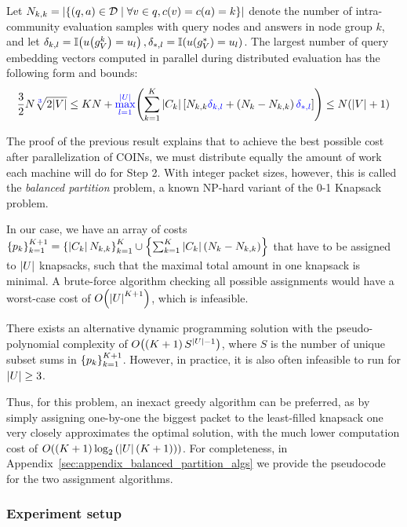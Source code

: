 \begin{proposition}
\label{proposition:complexity_distributed}
    Let $N_{k,k}=\mathopen{}\left|\mathopen{}\left\{\mathopen{}\left(q, a\right) \in \mathcal{D} \mid \forall v \in q, c\mathopen{}\left(v\right)=c\mathopen{}\left(a\right)=k\right\}\right|$ denote the number of intra-community evaluation samples with query nodes and answers in node group $k$, and let $\delta_{k,l}=\mathbb{I}\mathopen{}\left(u\mathopen{}\left(g_V^k\right)=u_l\right),\delta_{*,l}=\mathbb{I}\mathopen{}\left(u\mathopen{}\left(g_V^*\right)=u_l\right)$. The largest number of query embedding vectors computed in parallel during distributed evaluation has the following form and bounds:
\begin{equation}
\label{eq:complexity_and_bounds_distributed}
\frac{3}{2} N \sqrt[\textcolor{blue}{3}]{2\mathopen{}\left|V\right|} \leq KN+\textcolor{blue}{\max_{l=1}^{\mathopen{}\left|U\right|}}{\mathopen{}\left(\sum_{k=1}^{K}{\mathopen{}\left|C_k\right|\mathopen{}\left[N_{k,k}\textcolor{blue}{\delta_{k,l}} + \mathopen{}\left(N_k-N_{k,k}\right)\textcolor{blue}{\delta_{*,l}}\right]}\right)} \leq N \mathopen{}\left(\mathopen{}\left|V\right| + 1\right) 
\end{equation}
\end{proposition}
The proof of the previous result explains that to achieve the best possible cost after parallelization of COINs, we must distribute equally the amount of work each machine will do for Step 2. With integer packet sizes, however, this is called the \emph{balanced partition} problem, a known NP-hard variant of the 0-1 Knapsack problem. 

In our case, we have an array of costs $\mathopen{}\left\{p_k\right\}_{k=1}^{K+1}=\mathopen{}\left\{\mathopen{}\left|C_k\right|N_{k,k}\right\}_{k=1}^{K}\cup\mathopen{}\left\{\sum_{k=1}^{K}{\mathopen{}\left|C_k\right|\mathopen{}\left(N_{k}-N_{k,k}\right)}\right\}$ that have to be assigned to $\mathopen{}\left|U\right|$ knapsacks, such that the maximal total amount in one knapsack is minimal. A brute-force algorithm checking all possible assignments would have a worst-case cost of $O\mathopen{}\left(\mathopen{}\left|U\right|^{K+1}\right)$, which is infeasible. 

There exists an alternative dynamic programming solution with the pseudo-polynomial complexity of $O\mathopen{}\left(\mathopen{}\left(K+1\right)S^{\mathopen{}\left|U\right|-1}\right)$, where $S$ is the number of unique subset sums in $\mathopen{}\left\{p_k\right\}_{k=1}^{K+1}$. However, in practice, it is also often infeasible to run for $\mathopen{}\left|U\right|\geq 3$. 

Thus, for this problem, an inexact greedy algorithm can be preferred, as by simply assigning one-by-one the biggest packet to the least-filled knapsack one very closely approximates the optimal solution, with the much lower computation cost of $O\mathopen{}\left(\mathopen{}\left(K+1\right)\log_2{\mathopen{}\left(\mathopen{}\left|U\right|\mathopen{}\left(K+1\right)\right)}\right)$. For completeness, in Appendix~\ref{sec:appendix_balanced_partition_algs} we provide the pseudocode for the two assignment algorithms.
\subsubsection{Experiment setup}
